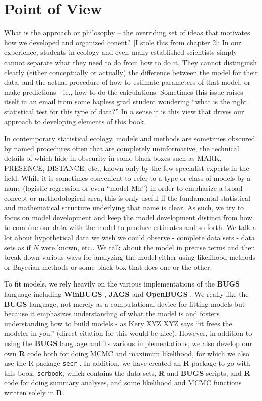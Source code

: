 \section*{Point of View}
What is the approach or philosophy -- the overriding set of ideas that
motivates how we developed and organized conent?
[I stole this from chapter 2]:
In our experience, students in ecology and even many established
scientists simply cannot separate what they need to do from how to do
it.  They cannot distinguish clearly (either conceptually or actually)
the difference between the model for their data, and the actual
procedure of how to estimate parameters of that model, or make
predictions - ie., how to do the calculations. Sometimes this issue
raises itself in an email from some hapless grad student wondering
``what is the right statistical test for this type of data?''  In a
sense it is this view that drives our approach to developing elements
of this book.

In contemporary statistical ecology, models and methods are sometimes
obscured by named procedures often that are completely uninformative,
the technical details of which hide in obscurity in some black boxes
such as MARK, PRESENCE, DISTANCE, etc., known only by the few
specialist experts in the field. While it is sometimes convenient to
refer to a type or class of models by a name (logistic regression or
even ``model Mh'') in order to emphasize a broad concept or
methodological area, this is only useful if the fundamental
statistical and mathematical structure underlying that name is
clear. As such, we try to focus on model development and keep the
model development distinct from how to combine our data with the model
to produce estimates and so forth. We talk a lot about hypothetical
data we wish we could observe - complete data sets - data sets as if
$N$ were known, etc.. We talk about the model in precise terms and
then break down various ways for analyzing the model either using
likelihood methods or Bayesian methods or some black-box that does one
or the other.

To fit models, we rely heavily on the various implementations of the
{\bf BUGS} language including {\bf WinBUGS} \citep{lunn_etal:2000},
{\bf JAGS} \citep{plummer:2003}
 and {\bf OpenBUGS} \citep{thomas_etal:2006}. We really like
the {\bf BUGS} language, not merely  as a computational device for
fitting models but because it emphasizes
understanding of what the model is and fosters understanding how to
build models - as Kery XYZ XYZ says ``it frees the modeler in you.''  (direct
citation for this would be nice).  However, in addition to using the
{\bf BUGS} language and its various implementations, we also develop our own
{\bf R} code both for doing MCMC
and maximum likelihood, for which we also use the R
package \mbox{\tt secr} \citep{efford:2011}. In addition, we have
created an {\bf R} package to go with this book, \mbox{\tt scrbook},
which contains the data sets, {\bf R} and {\bf BUGS} scripts, and {\bf
  R} code for doing summary analyses, and some likelihood and MCMC
functions written solely in {\bf R}.


